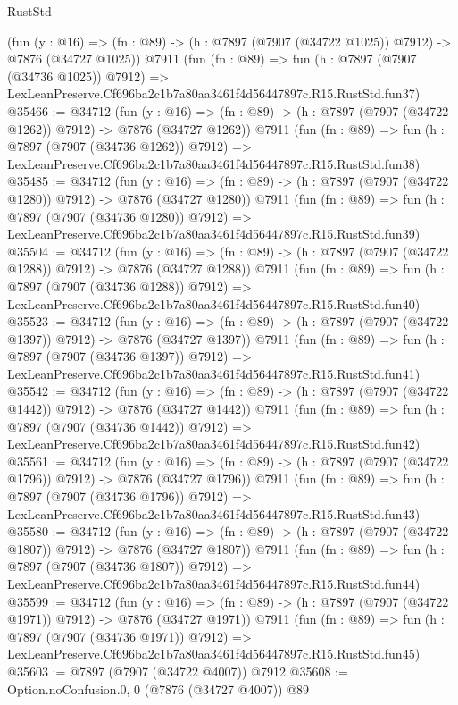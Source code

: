 \begin{lexlean}{RustStd}
\begin{coremodule}
    (fun (y : @16) =>
    (fn : @89) -> (h : @7897 (@7907 (@34722 @1025)) @7912) -> @7876 (@34727 @1025))
    @7911
    (fun (fn : @89) =>
    fun (h : @7897 (@7907 (@34736 @1025)) @7912) =>
    LexLeanPreserve.Cf696ba2c1b7a80aa3461f4d56447897c.R15.RustStd.fun37)
@35466 := @34712
    (fun (y : @16) =>
    (fn : @89) -> (h : @7897 (@7907 (@34722 @1262)) @7912) -> @7876 (@34727 @1262))
    @7911
    (fun (fn : @89) =>
    fun (h : @7897 (@7907 (@34736 @1262)) @7912) =>
    LexLeanPreserve.Cf696ba2c1b7a80aa3461f4d56447897c.R15.RustStd.fun38)
@35485 := @34712
    (fun (y : @16) =>
    (fn : @89) -> (h : @7897 (@7907 (@34722 @1280)) @7912) -> @7876 (@34727 @1280))
    @7911
    (fun (fn : @89) =>
    fun (h : @7897 (@7907 (@34736 @1280)) @7912) =>
    LexLeanPreserve.Cf696ba2c1b7a80aa3461f4d56447897c.R15.RustStd.fun39)
@35504 := @34712
    (fun (y : @16) =>
    (fn : @89) -> (h : @7897 (@7907 (@34722 @1288)) @7912) -> @7876 (@34727 @1288))
    @7911
    (fun (fn : @89) =>
    fun (h : @7897 (@7907 (@34736 @1288)) @7912) =>
    LexLeanPreserve.Cf696ba2c1b7a80aa3461f4d56447897c.R15.RustStd.fun40)
@35523 := @34712
    (fun (y : @16) =>
    (fn : @89) -> (h : @7897 (@7907 (@34722 @1397)) @7912) -> @7876 (@34727 @1397))
    @7911
    (fun (fn : @89) =>
    fun (h : @7897 (@7907 (@34736 @1397)) @7912) =>
    LexLeanPreserve.Cf696ba2c1b7a80aa3461f4d56447897c.R15.RustStd.fun41)
@35542 := @34712
    (fun (y : @16) =>
    (fn : @89) -> (h : @7897 (@7907 (@34722 @1442)) @7912) -> @7876 (@34727 @1442))
    @7911
    (fun (fn : @89) =>
    fun (h : @7897 (@7907 (@34736 @1442)) @7912) =>
    LexLeanPreserve.Cf696ba2c1b7a80aa3461f4d56447897c.R15.RustStd.fun42)
@35561 := @34712
    (fun (y : @16) =>
    (fn : @89) -> (h : @7897 (@7907 (@34722 @1796)) @7912) -> @7876 (@34727 @1796))
    @7911
    (fun (fn : @89) =>
    fun (h : @7897 (@7907 (@34736 @1796)) @7912) =>
    LexLeanPreserve.Cf696ba2c1b7a80aa3461f4d56447897c.R15.RustStd.fun43)
@35580 := @34712
    (fun (y : @16) =>
    (fn : @89) -> (h : @7897 (@7907 (@34722 @1807)) @7912) -> @7876 (@34727 @1807))
    @7911
    (fun (fn : @89) =>
    fun (h : @7897 (@7907 (@34736 @1807)) @7912) =>
    LexLeanPreserve.Cf696ba2c1b7a80aa3461f4d56447897c.R15.RustStd.fun44)
@35599 := @34712
    (fun (y : @16) =>
    (fn : @89) -> (h : @7897 (@7907 (@34722 @1971)) @7912) -> @7876 (@34727 @1971))
    @7911
    (fun (fn : @89) =>
    fun (h : @7897 (@7907 (@34736 @1971)) @7912) =>
    LexLeanPreserve.Cf696ba2c1b7a80aa3461f4d56447897c.R15.RustStd.fun45)
@35603 := @7897 (@7907 (@34722 @4007)) @7912
@35608 := Option.noConfusion.{0, 0} (@7876 (@34727 @4007)) @89

\end{coremodule}
\end{lexlean}
